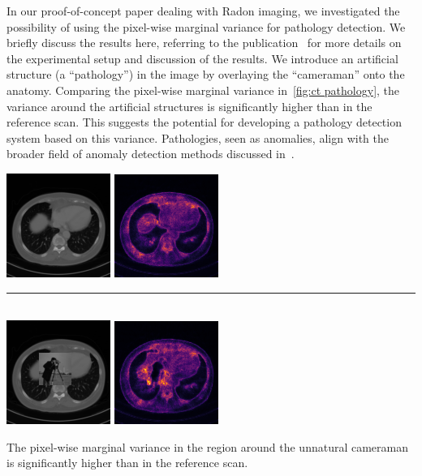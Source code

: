 In our proof-of-concept paper dealing with Radon imaging, we investigated the possibility of using the pixel-wise marginal variance for pathology detection.
We briefly discuss the results here, referring to the publication~\cite{zach_computed_2021} for more details on the experimental setup and discussion of the results.
We introduce an artificial structure (a \enquote{pathology}) in the image by overlaying the \enquote{cameraman} onto the anatomy.
Comparing the pixel-wise marginal variance in~\cref{fig:ct pathology}, the variance around the artificial structures is significantly higher than in the reference scan.
This suggests the potential for developing a pathology detection system based on this variance.
Pathologies, seen as anomalies, align with the broader field of anomaly detection methods discussed in~\cite{10.1145/3439950}.
\begin{sidefigure}
	\includegraphics[width=\marginparwidth]{ct/clean/scan}
	\includegraphics[width=\marginparwidth]{ct/clean/std}
	\rule[2mm]{\marginparwidth}{.3em}\\
	\includegraphics[width=\marginparwidth]{ct/cameraman/scan}
	\includegraphics[width=\marginparwidth]{ct/cameraman/std}
	\caption[Pathology detection via posterior variance]{The pixel-wise marginal variance in the region around the unnatural cameraman is significantly higher than in the reference scan.}%
	\label{fig:ct pathology}
\end{sidefigure}
